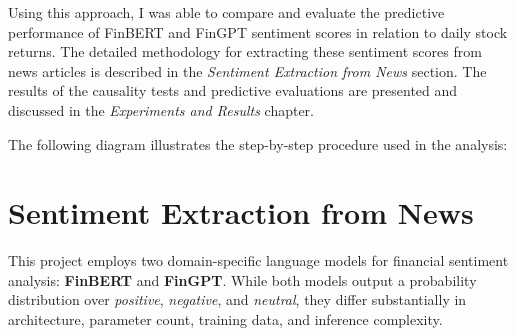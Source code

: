 \documentclass[12pt,a4paper]{report}
\begin{document}
Using this approach, I was able to compare and evaluate the predictive performance of FinBERT and FinGPT sentiment scores in relation to daily stock returns. The detailed methodology for extracting these sentiment scores from news articles is described in the \textit{Sentiment Extraction from News} section. The results of the causality tests and predictive evaluations are presented and discussed in the \textit{Experiments and Results} chapter.

The following diagram illustrates the step-by-step procedure used in the analysis:

\begin{center}
\end{center}

\section{Sentiment Extraction from News}
\label{sec:sentiment_extraction}

This project employs two domain-specific language models for financial sentiment analysis: \textbf{FinBERT} and \textbf{FinGPT}. While both models output a probability distribution over \textit{positive}, \textit{negative}, and \textit{neutral}, they differ substantially in architecture, parameter count, training data, and inference complexity.
\end{document}
